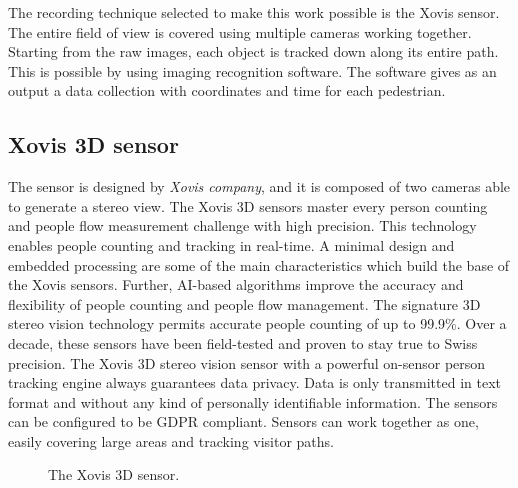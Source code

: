 \documentclass[class=article, crop=false]{standalone}
\begin{document}
The recording technique selected to make this work possible is the Xovis sensor. 
The entire field of view is covered using multiple cameras working together. 
Starting from the raw images, each object is tracked down along its entire path. 
This is possible by using imaging recognition software. 
The software gives as an output a data collection with coordinates and time for each pedestrian.



\subsection{Xovis 3D sensor}  %

The sensor is designed by \emph{Xovis company}, and it is composed of two cameras able to generate a stereo view. 
The Xovis 3D sensors master every person counting and people flow measurement challenge with high precision. 
This technology enables people counting and tracking in real-time. 
A minimal design and embedded processing are some of the main characteristics which build the base of the Xovis sensors. 
Further, AI-based algorithms improve the accuracy and flexibility of people counting and people flow management. 
The signature 3D stereo vision technology permits accurate people counting of up to 99.9\%. 
Over a decade, these sensors have been field-tested and proven to stay true to Swiss precision. 
The Xovis 3D stereo vision sensor with a powerful on-sensor person tracking engine always guarantees data privacy. 
Data is only transmitted in text format and without any kind of personally identifiable information. 
The sensors can be configured to be GDPR compliant. 
Sensors can work together as one, easily covering large areas and tracking visitor paths.
\begin{figure}[h]
    \centering
    \quad\quad
    \caption{The Xovis 3D sensor.}
    \label{fig:Xovis_sensor}
\end{figure}

 
\end{document}
